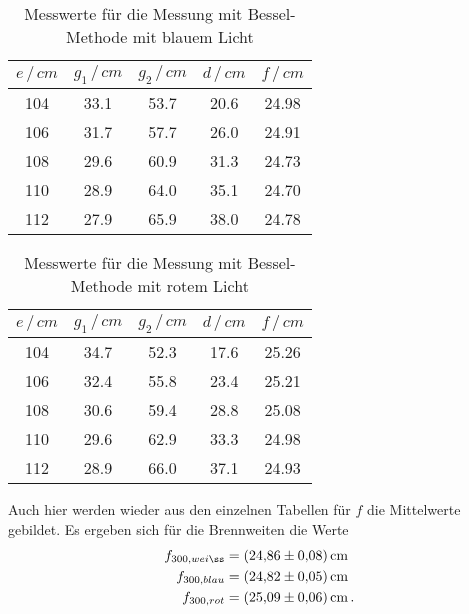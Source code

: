 \begin{table}
    \centering
    \caption{Messwerte für die Messung mit Bessel-Methode mit blauem Licht}
    \begin{tabular}{c c c c c}
        \toprule
        $ e\,/\,cm$ & $g_1\,/\,cm$ & $g_2\,/\,cm$ & $d\,/\,cm$ & $f\,/\,cm$ \\
        \midrule
        104 & 33.1 & 53.7 & 20.6 & 24.98 \\
        106 & 31.7 & 57.7 & 26.0 & 24.91 \\
        108 & 29.6 & 60.9 & 31.3 & 24.73 \\
        110 & 28.9 & 64.0 & 35.1 & 24.70 \\
        112 & 27.9 & 65.9 & 38.0 & 24.78 \\
        \bottomrule
    \end{tabular}
    \label{tab:besselblau}
\end{table}

\begin{table}
    \centering
    \caption{Messwerte für die Messung mit Bessel-Methode mit rotem Licht}
    \begin{tabular}{c c c c c}
        \toprule
        $ e\,/\,cm$ & $g_1\,/\,cm$ & $g_2\,/\,cm$ & $d\,/\,cm$ & $f\,/\,cm$ \\
        \midrule
        104 & 34.7 & 52.3 & 17.6 & 25.26 \\
        106 & 32.4 & 55.8 & 23.4 & 25.21 \\
        108 & 30.6 & 59.4 & 28.8 & 25.08 \\
        110 & 29.6 & 62.9 & 33.3 & 24.98 \\
        112 & 28.9 & 66.0 & 37.1 & 24.93 \\
        \bottomrule
    \end{tabular}
    \label{tab:besselrot}
\end{table}

Auch hier werden wieder aus den einzelnen Tabellen für $f$ die Mittelwerte gebildet. Es ergeben sich für die Brennweiten
die Werte 
\begin{align*}
    f_{300,weiß} &= \SI{24.86+-0.08}{\centi\metre} \\
    f_{300,blau} &= \SI{24.82+-0.05}{\centi\metre} \\
    f_{300,rot} &= \SI{25.09+-0.06}{\centi\metre} \, .
\end{align*}

